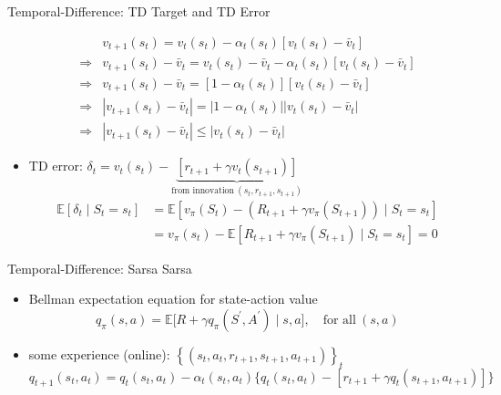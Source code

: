 \documentclass[UTF8, 10pt]{beamer}
\begin{document}
\begin{CJK*}{UTF8}{gbsn}
\begin{frame}{Temporal-Difference: TD Target and TD Error}
\begin{itemize}
			$$
			\begin{array}{ll} & v_{t+1}\left(s_{t}\right)=v_{t}\left(s_{t}\right)-\alpha_{t}\left(s_{t}\right)\left[v_{t}\left(s_{t}\right)-\bar{v}_{t}\right] \\ \Longrightarrow & v_{t+1}\left(s_{t}\right)-\bar{v}_{t}=v_{t}\left(s_{t}\right)-\bar{v}_{t}-\alpha_{t}\left(s_{t}\right)\left[v_{t}\left(s_{t}\right)-\bar{v}_{t}\right] \\ \Longrightarrow & v_{t+1}\left(s_{t}\right)-\bar{v}_{t}=\left[1-\alpha_{t}\left(s_{t}\right)\right]\left[v_{t}\left(s_{t}\right)-\bar{v}_{t}\right] \\ \Longrightarrow & \left|v_{t+1}\left(s_{t}\right)-\bar{v}_{t}\right|=\left|1-\alpha_{t}\left(s_{t}\right)\right|\left|v_{t}\left(s_{t}\right)-\bar{v}_{t}\right| \\
				\Longrightarrow & \left|v_{t+1}\left(s_{t}\right)-\bar{v}_{t}\right| \leq\left|v_{t}\left(s_{t}\right)-\bar{v}_{t}\right|
			\end{array}
			$$
		\item TD error:
			$
			\delta_{t}=v_{t}\left(s_{t}\right)-\underbrace{\left[r_{t+1}+\gamma v_{t}\left(s_{t+1}\right)\right]}_{\text{from innovation}\ (s_t, r_{t+1},s_{t+1})}
			$
			$$
			\begin{aligned} \mathbb{E}\left[\delta_{t} \mid S_{t}=s_{t}\right] & =\mathbb{E}\left[v_{\pi}\left(S_{t}\right)-\left(R_{t+1}+\gamma v_{\pi}\left(S_{t+1}\right)\right) \mid S_{t}=s_{t}\right] \\ & =v_{\pi}\left(s_{t}\right)-\mathbb{E}\left[R_{t+1}+\gamma v_{\pi}\left(S_{t+1}\right) \mid S_{t}=s_{t}\right] =0 \end{aligned}
			$$
	\end{itemize}
\end{frame}
\begin{frame}{Temporal-Difference: Sarsa}
	Sarsa
	\begin{itemize}
		\item Bellman expectation equation for state-action value
			$$
			q_{\pi}(s, a)=\mathbb{E}\Big[R+\gamma q_{\pi}\left(S^{\prime}, A^{\prime}\right) \mid s, a\Big], \quad \text{for all}\ (s, a)
			$$
		\item some experience (online):
			$\left\{\left(s_{t}, a_{t}, r_{t+1}, s_{t+1}, a_{t+1}\right)\right\}_{t}$
			$$
			q_{t+1}\left(s_{t}, a_{t}\right) =q_{t}\left(s_{t}, a_{t}\right)-\alpha_{t}\left(s_{t}, a_{t}\right)\Big\{q_{t}\left(s_{t}, a_{t}\right)-\left[r_{t+1}+\gamma q_{t}\left(s_{t+1}, a_{t+1}\right)\right]\Big\}
			$$
	\end{itemize}

\end{frame}
\end{CJK*}
\end{document}

